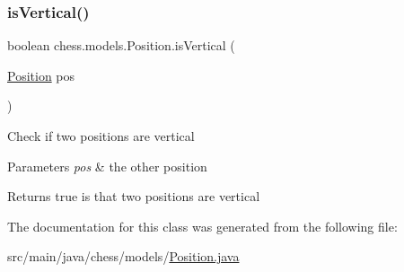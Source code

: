 \subsubsection{\texorpdfstring{is\+Vertical()}{isVertical()}}
{\footnotesize\ttfamily boolean chess.\+models.\+Position.\+is\+Vertical (\begin{DoxyParamCaption}\item[{\mbox{\hyperlink{classchess_1_1models_1_1_position}{Position}}}]{pos }\end{DoxyParamCaption})}

Check if two positions are vertical


\begin{DoxyParams}{Parameters}
{\em pos} & the other position \\
\hline
\end{DoxyParams}
\begin{DoxyReturn}{Returns}
true is that two positions are vertical 
\end{DoxyReturn}


The documentation for this class was generated from the following file\+:\begin{DoxyCompactItemize}
\item 
src/main/java/chess/models/\mbox{\hyperlink{_position_8java}{Position.\+java}}\end{DoxyCompactItemize}
